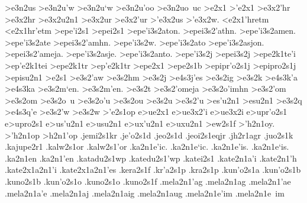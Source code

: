 {	>e3n2us
	>e3n2u'w    		%
	>e3n2u`w
	>e3n2u'oo
	>e3n2uo~uc
>e2x1
>'e2x1
	>e3x2'hr   		%
	>e3x2hr 		%
	>e3x2u2n1   		%
	>e3x2ur     		%
	>e3x2'ur  		%
	>'e3x2us  		%
	>'e3x2w.
<e2x1'hretm		%
<e2x1hr'etm
>epe'i2s1 		%
>epei2s1
	>epe'i3s2aton.	%
	>epei3s2'athn.
	>epe'i3s2amen.
	>epe'i3s2ate
	>epei3s2'amhn.
	>epe'i3s2w.
	>epe'i3s2ato
	>epe'i3s2asjon.
	>epei3s2'ameja.
	>epe'i3s2asje.
	>epe'i3s2anto.
	>epe'i3s2j	%
	>epei3s2j
>epe2k1te'i 		%
>ep'e2k1tei
>epe2k1tr 		%
>ep'e2k1tr
>epe2x1
>epe2s1b 		%
>epipr'o2s1j		%
>epipro2s1j
>episu2n1  		%
>e2s1
	>e3s2'aw 		%
	>e3s2hm  		%
	>e3s2j 			%
		>e4s3j'es 		%
	>e3s2ig 		%
	>e3s2k
		>e4s3k'a 		%
		>e4s3ka  		%
%
	>e3s2m`en.  >e3s2m'en.	%
	>e3s2t
	>e3s2'omeja
	>e3s2o'imhn
	>e3s2'om		%
	>e3s2om
	>e3s2o~u 		%
	>e3s2o'u %
    >e3s2ou %
%
	>e3s2u  		%
	>e3s2'u
	>es'u2n1 		%
	>esu2n1
	>e3s2q
		>e4s3q'e		%
	>e3s2'w
	>e3s2w
>'e2s1op 		%
e>ue2x1  		%
	e>ue3x2'i 		%
	e>ue3x2i
e>upr'o2s1 		%
e>upro2s1
e>us'u2n1 		%
e>usu2n1
e>ux'u2n1 		%
e>uxu2n1
>ew2s1f   		%
>'h2n1oy.		%
>'h2n1op
>h2n1'op
.jemi2s1kr  %
.je'o2s1d   %
.jeo2s1d
.jeoi2s1eqjr		%
.jh2r1agr  		%
.juo2s1k     		%
.kajupe2r1 		%
.kalw2s1or 	 	%
.kalw2s1'or
.ka2n1e'ic.		%
.ka2n1e`ic.
.ka2n1e'is.
.ka2n1e`is.
.ka2n1en
.ka2n1'en
.katadu2s1wp 		%
.katedu2s1'wp  		%
.katei2s1 		%
.kate2n1a'i 		%
.kate2n1'h 		%
.kate2x1a2n1'i 		%
.kate2x1a2n1'es   	%
.kera2s1f 		%
.kr'a2s1p 		%
.kra2s1p
.kun'o2s1a 		%
.kun'o2s1b 		%
.kuno2s1b
.kun'o2s1o 		%
.kuno2s1o
.kuno2s1f  		%
.mela2n1'ag			%
.mela2n1ag
.mela2n1'ae			%
.mela2n1a'e
.mela2n1aj			%
.mela2n1aig 		%
.mela2n1aug 		%
.mela2n1e'im 		%
.mela2n1e~im 		%
}
